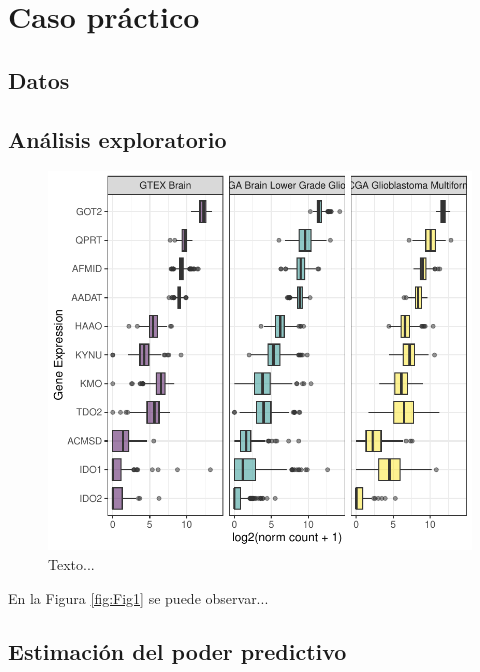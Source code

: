 
\chapter{Caso práctico} \label{CP}
\section{Datos}

\section{Análisis exploratorio}

\begin{figure}[h]
    \centering
    \includegraphics{Imagenes/Rplot.pdf}
    \caption{Texto...}
    \label{fig:Fig}
\end{figure}

En la Figura \ref{fig:Fig1} se puede observar...

\section{Estimación del poder predictivo}

